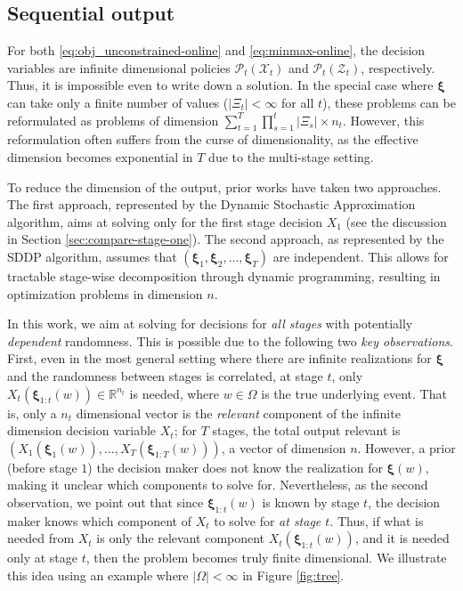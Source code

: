 \documentclass[11pt,fullpage,letterpaper]{article}
\newcommand{\mc}{\mathcal}
\newcommand{\R}{\mathbb{R}}
\newcommand{\bx}{\boldsymbol{\xi}}
\begin{document}
\subsection{Sequential output}\label{sec:seq_output}
For both \eqref{eq:obj_unconstrained-online} and \eqref{eq:minmax-online}, the decision variables are infinite dimensional policies $\mc P_t(\mc X_t)$ and $\mc P_t(\mc Z_t)$, respectively. Thus, it is impossible even to write down a solution. In the special case where $\bx$ can take only a finite number of values ($|\Xi_t|<\infty$ for all $t$), these problems can be reformulated as problems of dimension $\sum_{t=1}^T \prod_{s=1}^t|\Xi_s|\times n_t$. However, this reformulation often suffers from the curse of dimensionality, as the effective dimension becomes exponential in $T$ due to the multi-stage setting. 

To reduce the dimension of the output, prior works have taken two approaches. The first approach, represented by the Dynamic Stochastic Approximation algorithm, aims at solving only for the first stage decision $X_1$ (see the discussion in Section \ref{sec:compare-stage-one}). The second approach, as represented by the SDDP algorithm, assumes that $(\bx_1,\bx_2,\ldots,\bx_T)$ are independent. This allows for tractable stage-wise decomposition through dynamic programming, resulting in optimization problems in dimension $n$. 

In this work, we aim at solving for decisions for \textit{all stages} with potentially \textit{dependent} randomness. This is possible due to the following two \textit{key observations}. First, even in the most general setting where there are infinite realizations for $\bx$ and the randomness between stages is correlated, at stage $t$, only $X_t(\bx_{1:t}(w))\in \R^{n_t}$ is needed, where $w\in \Omega$ is the true underlying event. That is, only a $n_t$ dimensional vector is the \textit{relevant} component of the infinite dimension decision variable $X_t$; for $T$ stages, the total output relevant is $(X_1(\bx_{1}(w)),\ldots,X_T(\bx_{1:T}(w)))$, a vector of dimension $n$. However, a prior (before stage $1$) the decision maker does not know the realization for $\bx(w)$, making it unclear which components to solve for. Nevertheless, as the second observation, we point out that since $\bx_{1:t}(w)$ is known by stage $t$, the decision maker knows which component of $X_t$ to solve for \textit{at stage $t$}. Thus, if what is needed from $X_t$ is only the relevant component $X_t(\bx_{1:t}(w))$, and it is needed only at stage $t$, then the problem becomes truly finite dimensional. We illustrate this idea using an example where $|\Omega|<\infty$ in Figure \ref{fig:tree}. 
\end{document}
